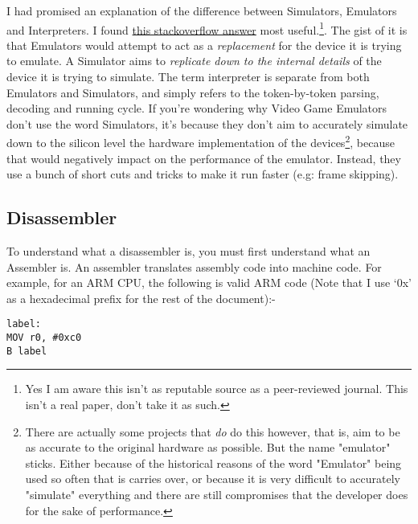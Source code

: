 \documentclass[twocolumn, a4paper,12pt]{article}
\begin{document}
I had promised an explanation of the difference between Simulators, Emulators and Interpreters. I found \href{https://stackoverflow.com/a/1584701}{this stackoverflow answer} most useful.\footnote{ Yes I am aware this isn't as reputable source as a peer-reviewed journal.
This isn't a real paper, don't take it as such.}. The gist of it is that Emulators would attempt to act as a \textit{replacement}
for the device it is trying to emulate. A Simulator aims to \textit{replicate down to the internal
details} of the device it is trying to simulate. The term interpreter is separate from both Emulators and Simulators, and simply
refers to the token-by-token parsing, decoding and running cycle. If you're wondering why Video Game Emulators don't use the word
Simulators, it's because they don't aim to accurately simulate down to the silicon level the hardware implementation of the devices\footnote{
	There are actually some projects that \textit{do} do this however, that is, aim to be as accurate to the original hardware 
	as possible. But the name "emulator" sticks. Either because of the historical reasons of the word "Emulator" being used
	so often that is carries over, or because it is very difficult to accurately "simulate" everything and there are still
	compromises that the developer does for the sake of performance.
}, because that would negatively impact on the performance of the emulator. Instead, they use a bunch of short cuts and tricks
to make it run faster (e.g: frame skipping). 

\subsection{Disassembler}
To understand what a disassembler is, you must first understand what an Assembler is. An assembler translates assembly code into
machine code. For example, for an ARM CPU, the following is valid ARM code (Note that I use `0x' as a hexadecimal prefix for the rest
of the document):-
\begin{lstlisting}
label:
MOV r0, #0xc0
B label
\end{lstlisting}
\end{document}
